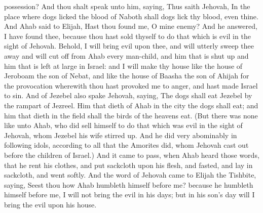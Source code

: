 possession? And thou shalt speak unto him, saying, Thus saith Jehovah, In the place where dogs licked the blood of Naboth shall dogs lick thy blood, even thine. And Ahab said to Elijah, Hast thou found me, O mine enemy? And he answered, I have found thee, because thou hast sold thyself to do that which is evil in the sight of Jehovah. Behold, I will bring evil upon thee, and will utterly sweep thee away and will cut off from Ahab every man-child, and him that is shut up and him that is left at large in Israel: and I will make thy house like the house of Jeroboam the son of Nebat, and like the house of Baasha the son of Ahijah for the provocation wherewith thou hast provoked me to anger, and hast made Israel to sin. And of Jezebel also spake Jehovah, saying, The dogs shall eat Jezebel by the rampart of Jezreel. Him that dieth of Ahab in the city the dogs shall eat; and him that dieth in the field shall the birds of the heavens eat. (But there was none like unto Ahab, who did sell himself to do that which was evil in the sight of Jehovah, whom Jezebel his wife stirred up. And he did very abominably in following idols, according to all that the Amorites did, whom Jehovah cast out before the children of Israel.)  And it came to pass, when Ahab heard those words, that he rent his clothes, and put sackcloth upon his flesh, and fasted, and lay in sackcloth, and went softly. And the word of Jehovah came to Elijah the Tishbite, saying, Seest thou how Ahab humbleth himself before me? because he humbleth himself before me, I will not bring the evil in his days; but in his son’s day will I bring the evil upon his house. 

